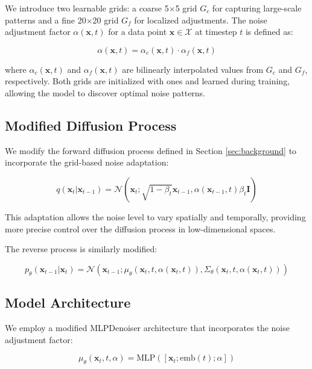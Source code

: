 \documentclass{article} %
\begin{document}
We introduce two learnable grids: a coarse 5$\times$5 grid $G_c$ for capturing large-scale patterns and a fine 20$\times$20 grid $G_f$ for localized adjustments. The noise adjustment factor $\alpha(\mathbf{x}, t)$ for a data point $\mathbf{x} \in \mathcal{X}$ at timestep $t$ is defined as:

\begin{equation}
    \alpha(\mathbf{x}, t) = \alpha_c(\mathbf{x}, t) \cdot \alpha_f(\mathbf{x}, t)
\end{equation}

where $\alpha_c(\mathbf{x}, t)$ and $\alpha_f(\mathbf{x}, t)$ are bilinearly interpolated values from $G_c$ and $G_f$, respectively. Both grids are initialized with ones and learned during training, allowing the model to discover optimal noise patterns.

\subsection{Modified Diffusion Process}

We modify the forward diffusion process defined in Section \ref{sec:background} to incorporate the grid-based noise adaptation:

\begin{equation}
    q(\mathbf{x}_t | \mathbf{x}_{t-1}) = \mathcal{N}(\mathbf{x}_t; \sqrt{1 - \beta_t}\mathbf{x}_{t-1}, \alpha(\mathbf{x}_{t-1}, t)\beta_t\mathbf{I})
\end{equation}

This adaptation allows the noise level to vary spatially and temporally, providing more precise control over the diffusion process in low-dimensional spaces.

The reverse process is similarly modified:

\begin{equation}
    p_\theta(\mathbf{x}_{t-1} | \mathbf{x}_t) = \mathcal{N}(\mathbf{x}_{t-1}; \mu_\theta(\mathbf{x}_t, t, \alpha(\mathbf{x}_t, t)), \Sigma_\theta(\mathbf{x}_t, t, \alpha(\mathbf{x}_t, t)))
\end{equation}

\subsection{Model Architecture}

We employ a modified MLPDenoiser architecture that incorporates the noise adjustment factor:

\begin{equation}
    \mu_\theta(\mathbf{x}_t, t, \alpha) = \text{MLP}([\mathbf{x}_t; \text{emb}(t); \alpha])
\end{equation}
\end{document}
